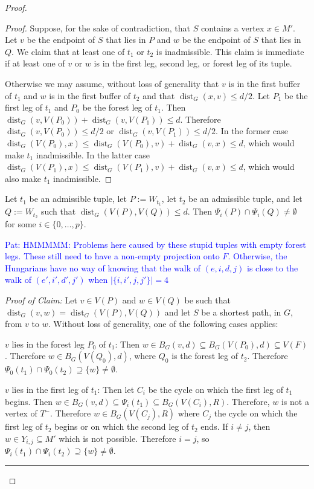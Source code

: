 \documentclass{patmorin}
\newcommand{\pat}[1]{\textcolor{Blue}{Pat: #1}}
\newenvironment{clmproof}{\noindent\emph{Proof of Claim:}}{\hfill\rule{1ex}{1ex}\newline}
\DeclareMathOperator{\dist}{dist}
\begin{document}
\begin{proof}
\begin{proof}      
    Suppose, for the sake of contradiction, that $S$ contains a vertex $x\in M'$. Let $v$ be the endpoint of $S$ that lies in $P$ and $w$ be the endpoint of $S$ that lies in $Q$.  We claim that at least one of $t_1$ or $t_2$ is inadmissible.  This claim is immediate if at least one of $v$ or $w$ is in the first leg, second leg, or forest leg of its tuple.  
    
    Otherwise we may assume, without loss of generality that $v$ is in the first buffer of $t_1$ and $w$ is in the first buffer of $t_2$ and that $\dist_G(x,v)\le d/2$.  Let $P_1$ be the first leg of $t_1$ and $P_0$ be the forest leg of $t_1$.  Then $\dist_G(v,V(P_0))+\dist_G(v,V(P_1))\le d$.  Therefore $\dist_G(v,V(P_0))\le d/2$ or $\dist_G(v,V(P_1))\le d/2$.  In the former case $\dist_G(V(P_0),x)\le \dist_G(V(P_0),v)+\dist_G(v,x)\le d$, which would make $t_1$ inadmissible.  In the latter case $\dist_G(V(P_1),x)\le \dist_G(V(P_1),v)+\dist_G(v,x)\le d$, which would also make $t_1$ inadmissible.
\end{proof}

\begin{clm}
  Let $t_1$ be an admissible tuple, let $P:=W_{t_1}$, let $t_2$ be an admissible tuple, and let $Q:=W_{t_2}$ such that $\dist_G(V(P),V(Q))\le d$.  Then $\Psi_i(P)\cap \Psi_i(Q)\neq\emptyset$ for some $i\in\{0,\ldots,p\}$.
\end{clm}


\pat{HMMMMM: Problems here caused by these stupid tuples with empty forest legs.  These still need to have a non-empty projection onto $F$.  Otherwise, the Hungarians have no way of knowing that the walk of $(e,i,d,j)$ is close to the walk of  $(e',i',d',j')$ when $|\{i,i',j,j'\}|=4$}



\begin{clmproof}
  Let $v\in V(P)$ and $w\in V(Q)$ be such that $\dist_G(v,w)=\dist_G(V(P),V(Q))$ and let $S$ be a shortest path, in $G$, from $v$ to $w$.   Without loss of generality, one of the following cases applies:

  \begin{compactitem}
      \item $v$ lies in the forest leg $P_0$ of $t_1$: Then $w\in B_G(v,d)\subseteq B_G(V(P_0),d)\subseteq V(F)$.  Therefore $w\in B_G(V(Q_0),d)$, where $Q_0$ is the forest leg of $t_2$.  Therefore $\Psi_0(t_1)\cap\Psi_0(t_2)\supseteq\{w\}\neq\emptyset$.

      \item $v$ lies in the first leg of $t_1$: Then let $C_i$ be the cycle on which the first leg of $t_1$ begins.  Then $w\in B_G(v,d)\subseteq\Psi_i(t_1)\subseteq B_G(V(C_i),R)$.  Therefore, $w$ is not a vertex of $T^-$.  Therefore $w\in B_G(V(C_j),R)$ where $C_j$ the cycle on which the first leg of $t_2$ begins or on which the second leg of $t_2$ ends. If $i\neq j$, then $w\in Y_{i,j}\subseteq M'$ which is not possible.  Therefore $i=j$, so $\Psi_i(t_1)\cap\Psi_i(t_2)\supseteq \{w\}\neq\emptyset$.    


\end{compactitem}
\end{clmproof}
\end{proof}
\end{document}
